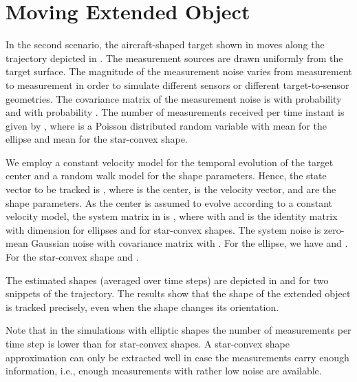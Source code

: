 \documentclass[preprint,1p,11pt]{ISAS_IR}
\newcommand{\placeFig}[1]{}
\begin{document}
\placeFig{5}

\placeFig{6}

\placeFig{7}


 \placeFig{8}




 







 

\section{Moving Extended Object}\label{ssec:eval_ellipse_dyn}
In the second scenario, the aircraft-shaped target  shown in   moves along the trajectory depicted in .
The measurement sources are drawn uniformly from the target surface.
The magnitude of the measurement noise varies from measurement to measurement in order to simulate different sensors or different target-to-sensor geometries.
The covariance matrix of the measurement noise is 
  with probability  and  with probability . 
The number of measurements received per time instant is given by  , where   is a Poisson distributed random variable  with mean  for the ellipse and mean  for the star-convex shape.




 
We employ a constant velocity model for the temporal evolution of the target center \cite{Bar-Shalom2002} and
a random walk model for the shape parameters.
Hence, the state vector to be tracked is , where   is the center,   is the velocity vector, and  are the shape parameters.
As the center is assumed to evolve according to a constant velocity model, the  system matrix  in  is 
 , where    with  and  is the identity matrix with dimension  for ellipses and  for star-convex shapes.
The system noise is zero-mean Gaussian noise with covariance matrix
  with 
.
For the ellipse, we have  and . For the star-convex shape   and . 



The estimated shapes (averaged over  time steps) are depicted in   and   for two snippets of the trajectory. 
The results show that the shape of the extended object is tracked precisely, even when the shape changes its orientation. 

Note that  in the simulations with elliptic  shapes the number of measurements per time step is lower than for star-convex shapes.
A star-convex shape approximation can only be extracted well in case the measurements carry enough information, i.e., enough measurements with rather low noise are available.
\end{document}
